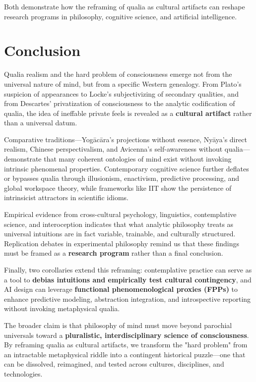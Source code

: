 \documentclass[11pt,a4paper]{article}
\begin{document}
Both demonstrate how the reframing of qualia as cultural artifacts can reshape research programs in philosophy, cognitive science, and artificial intelligence.

\section{Conclusion}

Qualia realism and the hard problem of consciousness emerge not from the universal nature of mind, but from a specific Western genealogy. From Plato's suspicion of appearances to Locke's subjectivizing of secondary qualities, and from Descartes' privatization of consciousness to the analytic codification of qualia, the idea of ineffable private feels is revealed as a \textbf{cultural artifact} rather than a universal datum.

Comparative traditions—Yogācāra's projections without essence, Nyāya's direct realism, Chinese perspectivalism, and Avicenna's self-awareness without qualia—demonstrate that many coherent ontologies of mind exist without invoking intrinsic phenomenal properties. Contemporary cognitive science further deflates or bypasses qualia through illusionism, enactivism, predictive processing, and global workspace theory, while frameworks like IIT show the persistence of intrinsicist attractors in scientific idioms.

Empirical evidence from cross-cultural psychology, linguistics, contemplative science, and interoception indicates that what analytic philosophy treats as universal intuitions are in fact variable, trainable, and culturally structured. Replication debates in experimental philosophy remind us that these findings must be framed as a \textbf{research program} rather than a final conclusion.

Finally, two corollaries extend this reframing: contemplative practice can serve as a tool to \textbf{debias intuitions and empirically test cultural contingency}, and AI design can leverage \textbf{functional phenomenological proxies (FPPs)} to enhance predictive modeling, abstraction integration, and introspective reporting without invoking metaphysical qualia.

The broader claim is that philosophy of mind must move beyond parochial universals toward a \textbf{pluralistic, interdisciplinary science of consciousness}. By reframing qualia as cultural artifacts, we transform the "hard problem" from an intractable metaphysical riddle into a contingent historical puzzle—one that can be dissolved, reimagined, and tested across cultures, disciplines, and technologies.



\end{document}
